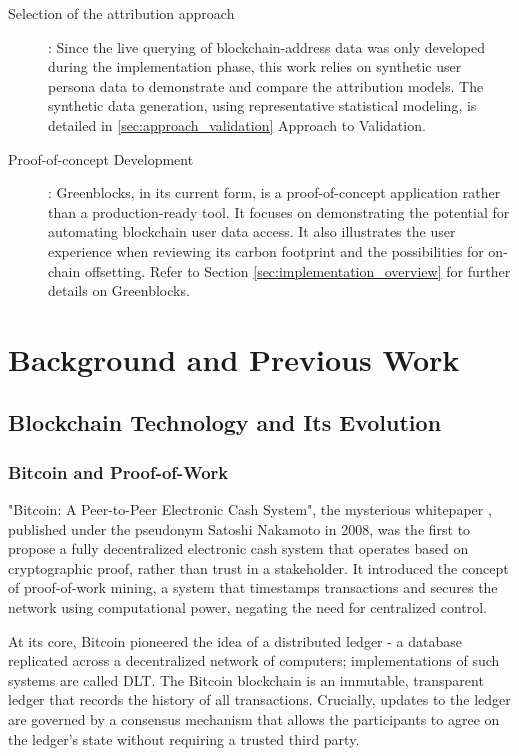 \documentclass[11pt]{report}
\begin{document}
\begin{description}
    \item [Selection of the attribution approach]: Since the live querying of blockchain-address data was only developed during the implementation phase, this work relies on synthetic user persona data to demonstrate and compare the attribution models. The synthetic data generation, using representative statistical modeling, is detailed in \ref{sec:approach_validation} Approach to Validation.
    \item [Proof-of-concept Development]: Greenblocks, in its current form, is a proof-of-concept application rather than a production-ready tool. It focuses on demonstrating the potential for automating blockchain user data access. It also illustrates the user experience when reviewing its carbon footprint and the possibilities for on-chain offsetting. Refer to Section \ref{sec:implementation_overview} for further details on Greenblocks.
\end{description}


\chapter{Background and Previous Work} \label{ch:previous_work}


\section{Blockchain Technology and Its Evolution}
\subsection{Bitcoin and Proof-of-Work}
"Bitcoin: A Peer-to-Peer Electronic Cash System", the mysterious whitepaper \cite{nakamotoBitcoinPeertopeerElectronic2008}, published under the pseudonym Satoshi Nakamoto in 2008, was the first to propose a fully decentralized electronic cash system that operates based on cryptographic proof, rather than trust in a stakeholder. It introduced the concept of proof-of-work mining, a system that timestamps transactions and secures the network using computational power, negating the need for centralized control.

At its core, Bitcoin pioneered the idea of a distributed ledger - a database replicated across a decentralized network of computers; implementations of such systems are called \ac{DLT}. The Bitcoin blockchain is an immutable, transparent ledger that records the history of all transactions. Crucially, updates to the ledger are governed by a consensus mechanism that allows the participants to agree on the ledger's state without requiring a trusted third party.
\end{document}
